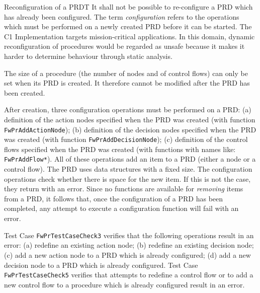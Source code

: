 \documentclass[requirements]{../fwprofile}
\begin{document}
\begin{fw_req_note}{Reconfiguration of a PRD}{T}
{It shall not be possible to re-configure a PRD which has already been configured.}
{The term \textit{configuration} refers to the operations which must be performed on a newly created PRD before it can be started.}
{ The C1 Implementation targets mission-critical applications. 
In this domain, dynamic reconfiguration of procedures would be regarded as unsafe because it makes 
it harder to determine behaviour through static analysis.}
{ The size of a procedure (the number of nodes and of control flows) 
can only be set when its PRD is created. It therefore cannot be modified after the PRD has been created.

After creation, three configuration operations must be performed on a PRD: 
(a) definition of the action nodes specified when the PRD was created (with function \texttt{FwPrAddActionNode}); 
(b) definition of the decision nodes specified when the PRD was created (with function \texttt{FwPrAddDecisionNode}); 
(c) definition of the control flows specified when the PRD was created (with functions with names like: \texttt{FwPrAddFlow*}). 
All of these operations add an item to a PRD (either a node or a control flow). The PRD uses data structures with a fixed size. The configuration operations check whether there is space for the new item. If this is not the case, they return with an error. Since no functions are available for \emph{removing} items from a PRD, it follows that, once the configuration of a PRD has been completed, any attempt to execute a configuration function will fail with an error.
} 
{ Test Case \texttt{FwPrTestCaseCheck3} verifies that the following operations 
result in an error: (a) redefine an existing action node; (b) redefine an existing decision node; 
(c) add a new action node to a PRD which is already configured; (d) add a new decision node to a 
PRD which is already configured. 
Test Case \texttt{FwPrTestCaseCheck5} verifies that attempts to redefine a control flow or to add a 
new control flow to a procedure which is already configured result in an error.}
\end{fw_req_note}
\end{document}
